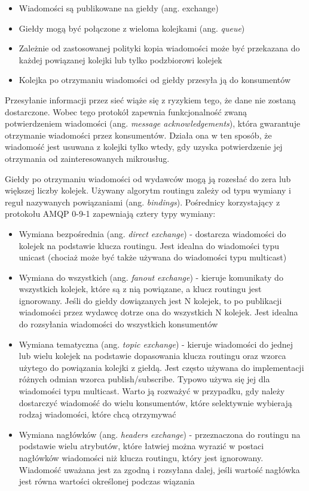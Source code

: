 \begin{itemize} %
    \item Wiadomości są publikowane na giełdy (ang. exchange)
    \item Giełdy mogą być połączone z wieloma kolejkami (ang. \textit{queue})
    \item Zależnie od zastosowanej polityki kopia wiadomości może być przekazana do 
    każdej powiązanej kolejki lub tylko podzbiorowi kolejek
    \item Kolejka po otrzymaniu wiadomości od giełdy przesyła ją do konsumentów
\end{itemize}

Przesyłanie informacji przez sieć wiąże się z ryzykiem tego, że dane nie zostaną 
dostarczone. Wobec tego protokół zapewnia funkcjonalność zwaną potwierdzeniem 
wiadomości (ang. \textit{message acknowledgements}), która gwarantuje otrzymanie wiadomości 
przez konsumentów. Działa ona w ten sposób, że wiadomość jest usuwana z kolejki tylko 
wtedy, gdy uzyska potwierdzenie jej otrzymania od zainteresowanych mikrousług.

Giełdy po otrzymaniu wiadomości od wydawców mogą ją rozesłać do zera lub większej 
liczby kolejek. Używany algorytm routingu zależy od typu wymiany i reguł nazywanych 
powiązaniami (ang. \textit{bindings}). Pośrednicy korzystający z protokołu AMQP 0-9-1 zapewniają 
cztery typy wymiany:

\begin{itemize} %
    \item Wymiana bezpośrednia (ang. \textit{direct exchange}) - dostarcza wiadomości do kolejek 
    na podstawie klucza routingu. Jest idealna do wiadomości typu unicast 
    (chociaż może być także używana do wiadomości typu multicast)
    \item Wymiana do wszystkich (ang. \textit{fanout exchange}) - kieruje komunikaty do wszystkich 
    kolejek, które są z nią powiązane, a klucz routingu jest ignorowany. Jeśli do 
    giełdy dowiązanych jest N kolejek, to po publikacji wiadomości przez wydawcę 
    dotrze ona do wszystkich N kolejek. Jest idealna do rozsyłania wiadomości do 
    wszystkich konsumentów
    \item Wymiana tematyczna (ang. \textit{topic exchange}) - kieruje wiadomości do jednej lub 
    wielu kolejek na podstawie dopasowania klucza routingu oraz wzorca użytego do 
    powiązania kolejki z giełdą. Jest często używana do implementacji różnych odmian 
    wzorca publish/subscribe. Typowo używa się jej dla wiadomości typu multicast. 
    Warto ją rozważyć w przypadku, gdy należy dostarczyć wiadomość do wielu 
    konsumentów, które selektywnie wybierają rodzaj wiadomości, które chcą otrzymywać
    \item Wymiana nagłówków (ang. \textit{headers exchange}) - przeznaczona do routingu na 
    podstawie wielu atrybutów, które łatwiej można wyrazić w postaci nagłówków 
    wiadomości niż klucza routingu, który jest ignorowany. Wiadomość uważana jest za 
    zgodną i rozsyłana dalej, jeśli wartość nagłówka jest równa wartości określonej 
    podczas wiązania
\end{itemize}

